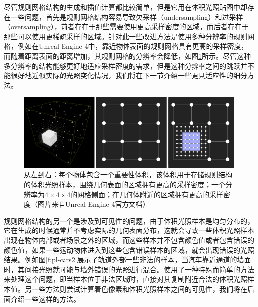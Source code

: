 尽管规则网格结构的生成和插值计算都比较简单，但是它用在体积光照贴图中却存在一些问题，首先是规则网格结构容易导致欠采样（undersampling）和过采样（oversampling），前者存在于那些需要使用更高采样密度的区域，而后者存在于那些可以使用更稀疏采样的区域。针对此一些改进方法是使用多种分辨率的规则网格，例如在Unreal Engine 4中，靠近物体表面的规则网格具有更高的采样密度，而随着距离表面的距离增加，其规则网格的分辨率会降低，如图\ref{f:pl-VLMDensity}所示。尽管这种多分辨率的结构能够更好地适应采样密度的需求，但是这种分辨率之间的跳跃并不能很好地近似实际的光照变化情况，我们将在下一节介绍一些更具适应性的细分方法。

\begin{figure}
\begin{fullwidth}
	\includegraphics[width=\thewidth]{figures/pl/VLMDensity}
	\caption{从左到右：每个物体包含一个重要性体积，该体积用于存储规则结构的体积光照样本，围绕几何表面的区域拥有更高的采样密度；一个分辨率为$4\times 4\times 4$的网格侧面；在几何体附近的区域拥有更高的采样密度（图片来自Unreal Engine 4官方文档）}
	\label{f:pl-VLMDensity}
\end{fullwidth}
\end{figure}

规则网格结构的另一个是涉及到可见性的问题\cite{a:VolumetricGlobalIlluminationAtTreyarch}，由于体积光照样本是均匀分布的，它在生成的时候通常并不考虑实际的几何表面分布，这就会导致一些体积光照样本出现在物体内部或者场景之外的区域，而这些样本并不包含颜色值或者包含错误的颜色值，如果一些运动物体进入到这些包含错误样本的区域，就会出现错误的光照结果。例如图\ref{f:pl-cars2}展示了轨道外部一些非法的样本，当汽车靠近通道的墙面时，其间接光照就可能与墙外错误的光照进行混合。\cite{a:RenderinginCars2}使用了一种特殊而简单的方法来处理这个问题，即当样本位于非法区域时，直接对其复制附近合法的体积光照样本值。另一些方法则尝试计算着色像素和体积光照样本之间的可见性，我们将在后面介绍一些这样的方法。

